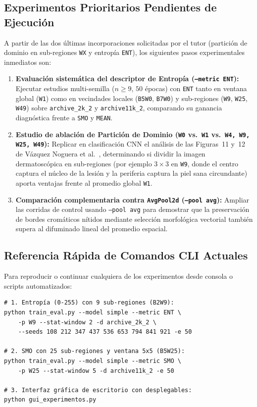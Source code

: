 \documentclass[10pt,a4paper,twocolumn]{article}
\begin{document}
\subsection{Experimentos Prioritarios Pendientes de Ejecución}
A partir de las dos últimas incorporaciones solicitadas por el tutor (partición de dominio en sub-regiones \texttt{WX} y entropía \texttt{ENT}), los siguientes pasos experimentales inmediatos son:
\begin{enumerate}[leftmargin=*,nosep]
  \item \textbf{Evaluación sistemática del descriptor de Entropía (\texttt{--metric ENT}):} Ejecutar estudios multi-semilla ($n \ge 9$, $50$ épocas) con \texttt{ENT} tanto en ventana global (\texttt{W1}) como en vecindades locales (\texttt{B5W0}, \texttt{B7W0}) y sub-regiones (\texttt{W9}, \texttt{W25}, \texttt{W49}) sobre \texttt{archive\_2k\_2} y \texttt{archive11k\_2}, comparando su ganancia diagnóstica frente a \texttt{SMO} y \texttt{MEAN}.
  \item \textbf{Estudio de ablación de Partición de Dominio (\texttt{W0} vs.\ \texttt{W1} vs.\ \texttt{W4, W9, W25, W49}):} Replicar en clasificación CNN el análisis de las Figuras~11 y~12 de Vázquez Noguera et al.~\cite{vazquez2019adaptive}, determinando si dividir la imagen dermatoscópica en sub-regiones (por ejemplo $3\times3$ en \texttt{W9}, donde el centro captura el núcleo de la lesión y la periferia captura la piel sana circundante) aporta ventajas frente al promedio global \texttt{W1}.
  \item \textbf{Comparación complementaria contra \texttt{AvgPool2d} (\texttt{--pool avg}):} Ampliar las corridas de control usando \texttt{--pool avg} para demostrar que la preservación de bordes cromáticos nítidos mediante selección morfológica vectorial también supera al difuminado lineal del promedio espacial.
\end{enumerate}

\subsection{Referencia Rápida de Comandos CLI Actuales}
Para reproducir o continuar cualquiera de los experimentos desde consola o scripts automatizados:
\begin{verbatim}
# 1. Entropía (0-255) con 9 sub-regiones (B2W9):
python train_eval.py --model simple --metric ENT \
    -p W9 --stat-window 2 -d archive_2k_2 \
    --seeds 108 212 347 437 536 653 794 841 921 -e 50

# 2. SMO con 25 sub-regiones y ventana 5x5 (B5W25):
python train_eval.py --model simple --metric SMO \
    -p W25 --stat-window 5 -d archive11k_2 -e 50

# 3. Interfaz gráfica de escritorio con desplegables:
python gui_experimentos.py
\end{verbatim}
\end{document}

